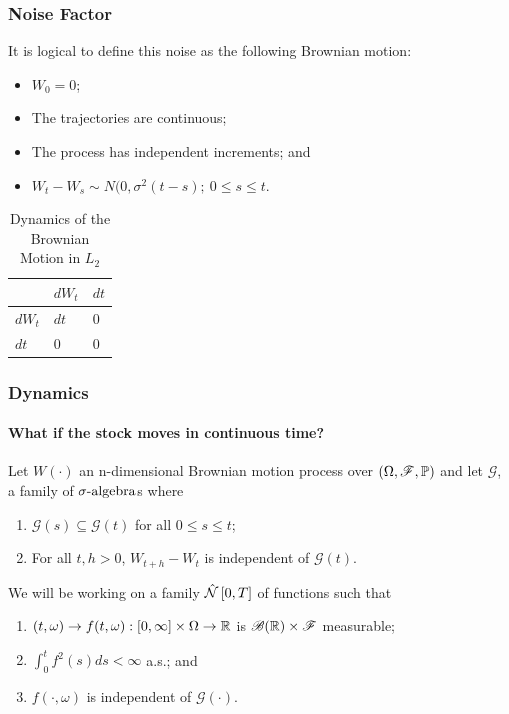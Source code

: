 \documentclass{beamer}
\begin{document}
\begin{frame}
\frametitle{Noise Factor}
	It is logical to define this noise as the following Brownian motion:
	\begin{definition}
	\begin{itemize}
		\item $W_0 = 0$;
		\item The trajectories are continuous; 
		\item The process has independent increments; and
		\item $W_t - W_s \sim N(0, \sigma^2(t - s); \ 0 \leq s \leq t$.
	\end{itemize}
	\end{definition}
	
\begin{table}
\centering
\label{table:bm-property}
\begin{tabular}{l|ll}
       & $dW_t$ & $dt$ \\
       \hline
$dW_t$ & $dt$   & 0    \\
$dt$   & 0      & 0   
\end{tabular}
\caption{Dynamics of the Brownian Motion in $L_2$}
\end{table}
\end{frame}

\begin{frame}
\frametitle{Dynamics}
\framesubtitle{What if the stock moves in continuous time?}
Let $W(\cdot)$ an n-dimensional Brownian motion process over $(\Omega, \mathscr{F}, \mathbb{P})$ and let $\mathscr{G}$, a family of $\sigma\text{-algebra}$s where
	\begin{enumerate}
		\item $\mathscr{G}(s) \subseteq \mathscr{G}(t)$ for all $0\leq s \leq t$;
		\item For all $t, h > 0$, $W_{t+h} - W_t$ is independent of $\mathscr{G}(t)$.
	\end{enumerate}
	We will be working on a family $\Nhatfam{0}{T}$ of functions such that
	\begin{definition}[$\Nhatfam{0}{T}$]
	\begin{enumerate}
		\item $(t, \omega) \to f(t, \omega):[0, \infty]\times\Omega \to \mathbb{R}$ is $\mathscr{B}(\mathbb{R})\times\mathscr{F}$ measurable;
		\item $\int_0^t f^2(s) ds < \infty$ a.s.; and
		\item $f(\cdot, \omega)$ is independent of $\mathscr{G}(\cdot)$.
	\end{enumerate}
\end{definition}
\end{frame}
\end{document}
